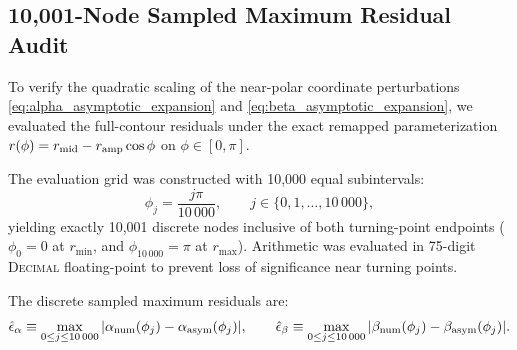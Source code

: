 \subsection{10,001-Node Sampled Maximum Residual Audit}
To verify the quadratic scaling of the near-polar coordinate perturbations \eqref{eq:alpha_asymptotic_expansion} and \eqref{eq:beta_asymptotic_expansion}, we evaluated the full-contour residuals under the exact remapped parameterization $r(\phi) = r_{\rm mid} - r_{\rm amp}\cos\phi$ on $\phi \in [0, \pi]$.

The evaluation grid was constructed with 10,000 equal subintervals:
\begin{equation}
    \phi_j = \frac{j\pi}{10\,000}, \qquad j \in \{0, 1, \dots, 10\,000\},
\end{equation}
yielding exactly 10,001 discrete nodes inclusive of both turning-point endpoints ($\phi_0 = 0$ at $r_{\min}$, and $\phi_{10\,000} = \pi$ at $r_{\max}$). Arithmetic was evaluated in 75-digit \textsc{Decimal} floating-point to prevent loss of significance near turning points.

The discrete sampled maximum residuals are:
\begin{equation}
    \hat{\epsilon}_\alpha \equiv \max_{0 \le j \le 10\,000} |\alpha_{\rm num}(\phi_j) - \alpha_{\rm asym}(\phi_j)|, \qquad
    \hat{\epsilon}_\beta \equiv \max_{0 \le j \le 10\,000} |\beta_{\rm num}(\phi_j) - \beta_{\rm asym}(\phi_j)|.
    \label{eq:sampled_maxima_defs}
\end{equation}


